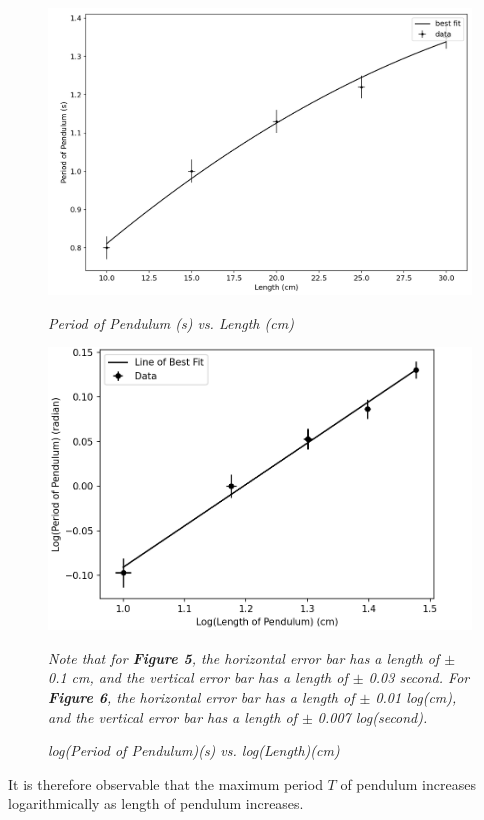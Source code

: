 \documentclass{article}
\begin{document}
\begin{figure}[!htp]
	\begin{minipage}{.5\textwidth}
	\includegraphics[scale = 0.3]{Pendulum_Length_Image.png}
	\caption{\textit{Period of Pendulum (s) vs. Length (cm)}}
	
	\label{length}
	\end{minipage}%
	\begin{minipage}{.7\textwidth}
		\includegraphics[scale = 0.45]{loglog.png}
	\caption{\textit{log(Period of Pendulum)(s) vs. log(Length)(cm)}}
	\end{minipage}
	\center \textit{Note that for \textbf{Figure 5}, the horizontal error bar has a length of $\pm$ 0.1 cm, and the vertical error bar has a length of $\pm$ 0.03 second. For \textbf{Figure 6}, the horizontal error bar has a length of $\pm$ 0.01 log(cm), and the vertical error bar has a length of $\pm$ 0.007 log(second).}
\end{figure}
It is therefore observable that the maximum period $T$ of pendulum increases logarithmically as length of pendulum increases.
\end{document}
